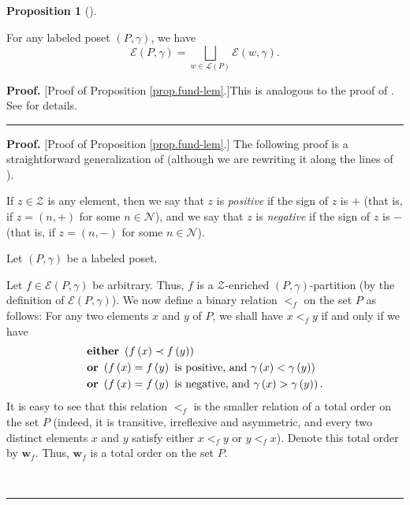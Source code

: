 \documentclass[numbers=enddot,12pt,final,onecolumn,notitlepage]{scrartcl}%
\theoremstyle{definition}
\newtheorem{prop}[theo]{Proposition}
\newenvironment{proposition}[1][]
{\begin{prop}[#1]\begin{leftbar}}
{\end{leftbar}\end{prop}}
\newenvironment{proof}[1][Proof]{\noindent\textbf{#1.} }{\ \rule{0.5em}{0.5em}}
\newenvironment{verlong}{}{}
\newenvironment{vershort}{}{}
\begin{document}
\begin{proposition}
\label{prop.fund-lem}For any labeled poset $\left(  P,\gamma\right)  $, we
have%
\[
\mathcal{E}\left(  P,\gamma\right)  =\bigsqcup_{w\in\mathcal{L}\left(
P\right)  }\mathcal{E}\left(  w,\gamma\right)  .
\]

\end{proposition}

\begin{vershort}
\begin{proof}
[Proof of Proposition \ref{prop.fund-lem}.]This is analogous to the proof of
\cite[Lemma 2.1]{Stembr97}.
See \cite{verlong} for details.
\end{proof}
\end{vershort}

\begin{verlong}
\begin{proof}
[Proof of Proposition \ref{prop.fund-lem}.] The following proof is a
straightforward generalization of \cite[proof of Lemma 2.1]{Stembr97}
(although we are
rewriting it along the lines of \cite[solution to Exercise 5.2.13]{HopfComb}).

If $z\in\mathcal{Z}$ is any element, then we say that $z$ is \textit{positive}
if the sign of $z$ is $+$ (that is, if $z=\left(  n,+\right)  $ for some
$n\in\mathcal{N}$), and we say that $z$ is \textit{negative} if the sign of
$z$ is $-$ (that is, if $z=\left(  n,-\right)  $ for some $n\in\mathcal{N}$).

Let $\left(P, \gamma\right)$ be a labeled poset.

Let $f\in\mathcal{E}\left(  P,\gamma\right)  $ be arbitrary. Thus, $f$ is a
$\mathcal{Z}$-enriched $\left(  P,\gamma\right)  $-partition (by the
definition of $\mathcal{E}\left(  P,\gamma\right)  $). We now define a binary
relation $<_{f}$ on the set $P$ as follows: For any two elements $x$ and $y$
of $P$, we shall have $x<_{f}y$ if and only if we have%
\begin{align*}
& \text{\textbf{either} }\left(  f\left(  x\right)  \prec f\left(  y\right)
\right)  \\
& \text{\textbf{or} }\left(  f\left(  x\right)  =f\left(  y\right)  \text{ is
positive, and }\gamma\left(  x\right)  <\gamma\left(  y\right)  \right)  \\
& \text{\textbf{or} }\left(  f\left(  x\right)  =f\left(  y\right)  \text{ is
negative, and }\gamma\left(  x\right)  >\gamma\left(  y\right)  \right)
\text{.}%
\end{align*}
It is easy to see that this relation $<_{f}$ is the smaller relation of a
total order on the set $P$
(indeed, it is transitive, irreflexive and asymmetric, and
every two distinct elements $x$ and $y$ satisfy either $x<_{f}y$ or $y<_{f}%
x$). Denote this total order by $\mathbf{w}_{f}$. Thus, $\mathbf{w}_{f}$ is a
total order on the set $P$.


\end{proof}
\end{verlong}
\end{document}
